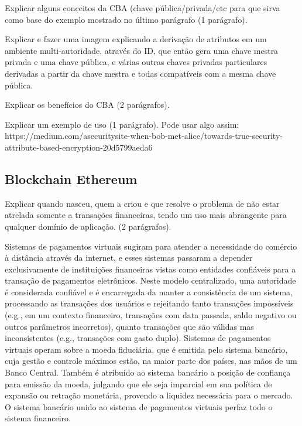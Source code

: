 \documentclass[a4paper,11pt]{article}
\begin{document}
{\color{ForestGreen}Explicar alguns conceitos da CBA (chave pública/privada/etc para que sirva como base do exemplo mostrado no último parágrafo (1 parágrafo).}

{\color{RoyalBlue}Explicar e fazer uma imagem explicando a derivação de atributos em um ambiente multi-autoridade, através do ID, que então gera uma chave mestra privada e uma chave pública, e várias outras chaves privadas particulares derivadas a partir da chave mestra e todas compatíveis com a mesma chave pública.}

{\color{ForestGreen}Explicar os benefícios do CBA (2 parágrafos).}

{\color{ForestGreen}Explicar um exemplo de uso (1 parágrafo). Pode usar algo assim: https://medium.com/asecuritysite-when-bob-met-alice/towards-true-security-attribute-based-encryption-20d5799aeda6}

\subsection{Blockchain Ethereum}

{\color{ForestGreen}Explicar quando nasceu, quem a criou e que resolve o problema de não estar atrelada somente a transações financeiras, tendo um uso mais abrangente para qualquer domínio de aplicação. (2 parágrafos).}

 Sistemas de pagamentos virtuais sugiram para atender a necessidade do comércio à distância através da internet, e esses sistemas passaram a depender exclusivamente de instituições financeiras vistas como entidades confiáveis para a transação de pagamentos eletrônicos.
 Neste modelo centralizado, uma autoridade é considerada confiável e é encarregada da manter a consistência de um sistema, processando as transações dos usuários e rejeitando tanto transações impossíveis (e.g., em um contexto financeiro, transações com data passada, saldo negativo ou outros parâmetros incorretos), quanto transações que são válidas mas inconsistentes (e.g., transações com gasto duplo).
 Sistemas de pagamentos virtuais operam sobre a moeda fiduciária, que é emitida pelo sistema bancário, cuja gestão e controle máximos estão, na maior parte dos países, nas mãos de um Banco Central. Também é atribuído ao sistema bancário a posição de confiança para emissão da moeda, julgando que ele seja imparcial em sua política de expansão ou retração monetária, provendo a liquidez necessária para o mercado. O sistema bancário unido ao sistema de pagamentos virtuais perfaz todo o sistema financeiro.
\end{document}
